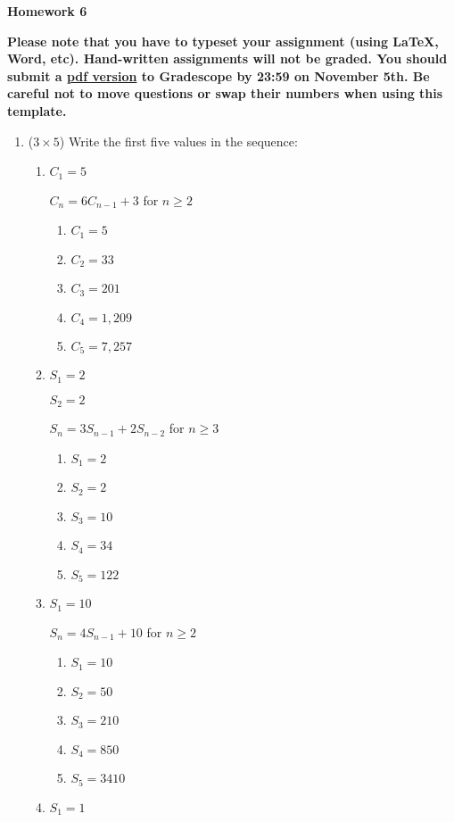 \documentclass[12pt]{article}
\date{}
\begin{document}
\begin{flushleft}
\large \bf
Homework 6 \\
\end{flushleft}
{\bf
Please note that you have to typeset your assignment (using \LaTeX, Word, etc). Hand-written assignments will not be graded. You should submit a \underline{pdf version} to Gradescope by 23:59 on November 5th. Be careful not to move questions or swap their numbers when using this template.
}


\begin{enumerate}

	\item ($3 \times 5$)
		Write the first five values in the sequence:
	\begin{enumerate}
		\item
		$C_1 = 5$

		$C_n = 6C_{n-1} + 3$ for $n \geq 2$

		\begin{enumerate}
			\item $C_1 = 5$
			\item $C_2 = 33$
			\item $C_3 = 201$
			\item $C_4 = 1,209$
			\item $C_5 = 7,257$
		\end{enumerate}
		\item
		$S_1 = 2$

		$S_2 = 2$

		$S_n = 3S_{n-1} + 2S_{n-2}$ for $n \geq 3$

		\begin{enumerate}
			\item $S_1 = 2$
			\item $S_2 = 2$
			\item $S_3 = 10$
			\item $S_4 = 34$
			\item $S_5 = 122$
		\end{enumerate}
		\item
		$S_1 = 10$

		$S_n = 4S_{n-1} + 10$ for $n \geq 2$

		\begin{enumerate}
			\item $S_1 = 10$
			\item $S_2 = 50$
			\item $S_3 = 210$
			\item $S_4 = 850$
			\item $S_5 = 3410$
		\end{enumerate}
		\newpage
		\item
		$S_1 = 1$


\end{enumerate}
\end{enumerate}
\end{document}
